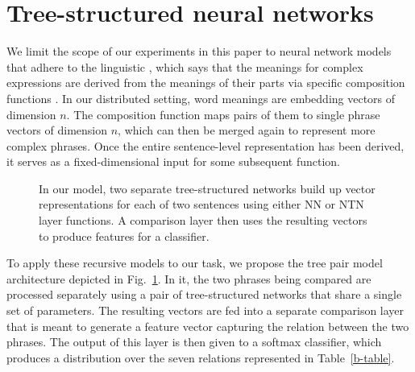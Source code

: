 
\section{Tree-structured neural networks} \label{methods}

We limit the scope of our experiments in this paper to neural network models 
that adhere to the linguistic , which says that the meanings for complex
expressions are derived from the meanings of their parts
via specific composition functions \cite{Partee84,Janssen97}. In our
distributed setting, word meanings are embedding vectors of dimension $n$. The
composition function maps pairs of them to single phrase vectors of dimension $n$, 
which can then be merged again to represent more complex
phrases. Once the entire sentence-level representation has been
derived, it serves as a fixed-dimensional input for some subsequent function.

\begin{figure}[tp]
  \centering
  
  \caption{In our model, two separate tree-structured networks build up vector representations for each of two sentences using either NN or NTN layer functions. A comparison layer then uses the resulting vectors to produce features for a classifier.} 
  \label{sample-figure}
\end{figure}

To apply these recursive models to our task, we propose the tree 
pair model architecture depicted in Fig.~\ref{sample-figure}. 
In it, the two phrases being compared are processed separately using a pair 
of tree-structured networks that share a single set of parameters. 
The resulting vectors are fed into a separate comparison
layer that is meant to generate a feature vector capturing the
relation between the two phrases. The output of this layer is then
given to a softmax classifier, which produces a
distribution over the seven relations represented in Table~\ref{b-table}.

